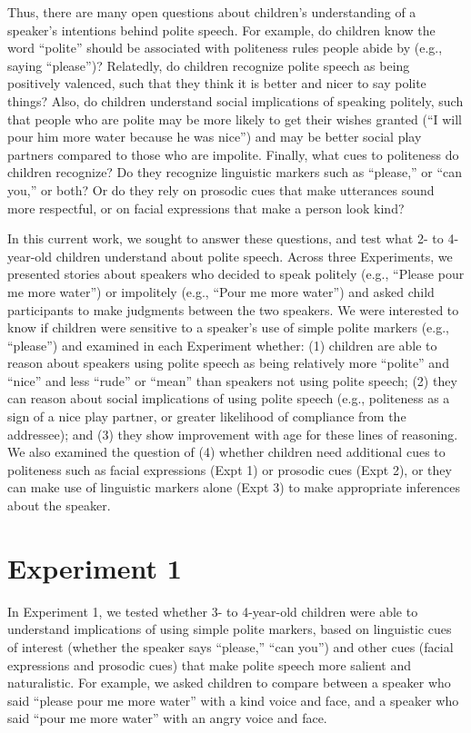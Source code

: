 \documentclass[10pt, letterpaper]{article}
\begin{document}
Thus, there are many open questions about children's understanding of a
speaker's intentions behind polite speech. For example, do children know
the word ``polite'' should be associated with politeness rules people
abide by (e.g., saying ``please'')? Relatedly, do children recognize
polite speech as being positively valenced, such that they think it is
better and nicer to say polite things? Also, do children understand
social implications of speaking politely, such that people who are
polite may be more likely to get their wishes granted (``I will pour him
more water because he was nice'') and may be better social play partners
compared to those who are impolite. Finally, what cues to politeness do
children recognize? Do they recognize linguistic markers such as
``please,'' or ``can you,'' or both? Or do they rely on prosodic cues
that make utterances sound more respectful, or on facial expressions
that make a person look kind?

In this current work, we sought to answer these questions, and test what
2- to 4-year-old children understand about polite speech. Across three
Experiments, we presented stories about speakers who decided to speak
politely (e.g., ``Please pour me more water'') or impolitely (e.g.,
``Pour me more water'') and asked child participants to make judgments
between the two speakers. We were interested to know if children were
sensitive to a speaker's use of simple polite markers (e.g., ``please'')
and examined in each Experiment whether: (1) children are able to reason
about speakers using polite speech as being relatively more ``polite''
and ``nice'' and less ``rude'' or ``mean'' than speakers not using
polite speech; (2) they can reason about social implications of using
polite speech (e.g., politeness as a sign of a nice play partner, or
greater likelihood of compliance from the addressee); and (3) they show
improvement with age for these lines of reasoning. We also examined the
question of (4) whether children need additional cues to politeness such
as facial expressions (Expt 1) or prosodic cues (Expt 2), or they can
make use of linguistic markers alone (Expt 3) to make appropriate
inferences about the speaker.

\section{Experiment 1}\label{experiment-1}

In Experiment 1, we tested whether 3- to 4-year-old children were able
to understand implications of using simple polite markers, based on
linguistic cues of interest (whether the speaker says ``please,'' ``can
you'') and other cues (facial expressions and prosodic cues) that make
polite speech more salient and naturalistic. For example, we asked
children to compare between a speaker who said ``please pour me more
water'' with a kind voice and face, and a speaker who said ``pour me
more water'' with an angry voice and face.
\end{document}

